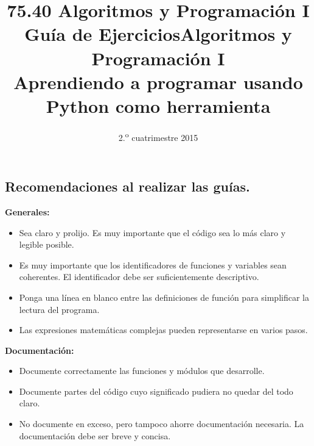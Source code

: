 \documentclass[11pt,spanish,a4paper,twoside,openany]{book}
\title{75.40 Algoritmos y Programación I \\
    \textbf{Guía de Ejercicios}}
\date{2.\textsuperscript{o} cuatrimestre 2015}
\theoremstyle{definition}
\theoremstyle{definition}
\theoremstyle{remark}
\begin{document}
\begin{extract} %
\maketitle
\thispagestyle{empty}

\newpage

\section*{Recomendaciones al realizar las guías.}

\textbf{Generales:}
\begin{itemize}
	\item Sea claro y prolijo. Es muy importante que el código sea lo más claro y legible posible.
	\item Es muy importante que los identificadores de funciones y variables sean coherentes. El identificador debe ser suficientemente descriptivo.
	\item Ponga una línea en blanco entre las definiciones de función para simplificar la lectura del programa.
	\item Las expresiones matemáticas complejas pueden representarse en varios pasos.
\end{itemize}

\textbf{Documentación:}
\begin{itemize}
	\item Documente correctamente las funciones y módulos que desarrolle.
	\item Documente partes del código cuyo significado pudiera no quedar del todo claro.
	\item No documente en exceso, pero tampoco ahorre documentación necesaria. La documentación debe ser breve y concisa.
\end{itemize}
\end{extract}

%
\title{Algoritmos y Programación I \\ Aprendiendo a programar usando Python como herramienta}
\date{}
\maketitle

\tableofcontents  %

\end{document}
